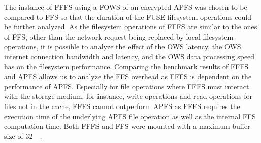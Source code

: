 The instance of \gls{FFFS} using a \gls{FOWS} of an encrypted \gls{APFS} was chosen to be compared to \gls{FFS} so that the duration of the \gls{FUSE} filesystem operations could be further analyzed. As the filesystem operations of \gls{FFFS} are similar to the ones of \gls{FFS}, other than the network request being replaced by local filesystem operations, it is possible to analyze the effect of the \gls{OWS} latency, the \gls{OWS} internet connection bandwidth and latency, and the \gls{OWS} data processing speed has on the filesystem performance. Comparing the benchmark results of \gls{FFFS} and \gls{APFS} allows us to analyze the \gls{FFS} overhead as \gls{FFFS} is dependent on the performance of \gls{APFS}. Especially for file operations where \gls{FFFS} must interact with the storage medium, for instance, write operations and read operations for files not in the cache, \gls{FFFS} cannot outperform \gls{APFS} as \gls{FFFS} requires the execution time of the underlying \gls{APFS} file operation as well as the internal \gls{FFS} computation time. Both \gls{FFFS} and \gls{FFS} were mounted with a maximum buffer size of \SI{32}{\mega\byte}.

